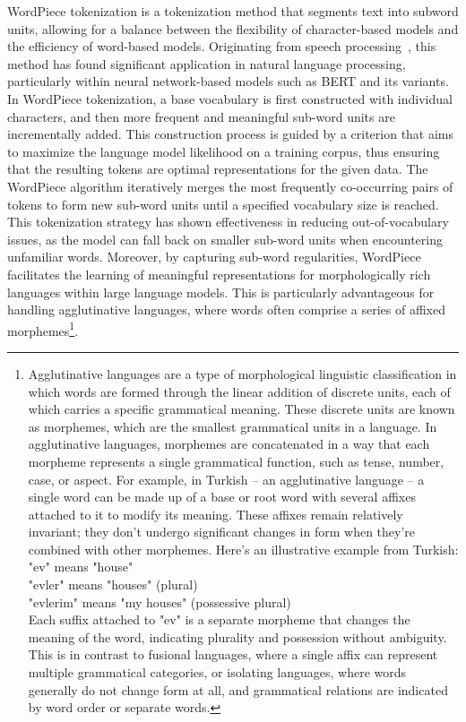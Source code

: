 WordPiece tokenization is a tokenization method that segments text into subword units, allowing for a balance between the flexibility of character-based models and the efficiency of word-based models.
Originating from speech processing~\cite{wu2016google}, this method has found significant application in natural language processing, particularly within neural network-based models such as BERT and its variants.
In WordPiece tokenization, a base vocabulary is first constructed with individual characters, and then more frequent and meaningful sub-word units are incrementally added.
This construction process is guided by a criterion that aims to maximize the language model likelihood on a training corpus, thus ensuring that the resulting tokens are optimal representations for the given data.
The WordPiece algorithm iteratively merges the most frequently co-occurring pairs of tokens to form new sub-word units until a specified vocabulary size is reached.
This tokenization strategy has shown effectiveness in reducing out-of-vocabulary issues, as the model can fall back on smaller sub-word units when encountering unfamiliar words.
Moreover, by capturing sub-word regularities, WordPiece facilitates the learning of meaningful representations for morphologically rich languages within large language models.
This is particularly advantageous for handling agglutinative languages, where words often comprise a series of affixed morphemes\footnote{
	Agglutinative languages are a type of morphological linguistic classification in which words are formed through the linear addition of discrete units, each of which carries a specific grammatical meaning. These discrete units are known as morphemes, which are the smallest grammatical units in a language. In agglutinative languages, morphemes are concatenated in a way that each morpheme represents a single grammatical function, such as tense, number, case, or aspect.
	For example, in Turkish -- an agglutinative language -- a single word can be made up of a base or root word with several affixes attached to it to modify its meaning. These affixes remain relatively invariant; they don’t undergo significant changes in form when they’re combined with other morphemes. Here’s an illustrative example from Turkish:\\
	"ev" means "house"\\
	"evler" means "houses" (plural)\\
	"evlerim" means "my houses" (possessive plural)\\
	Each suffix attached to "ev" is a separate morpheme that changes the meaning of the word, indicating plurality and possession without ambiguity.
	This is in contrast to fusional languages, where a single affix can represent multiple grammatical categories, or isolating languages, where words generally do not change form at all, and grammatical relations are indicated by word order or separate words.
}.

